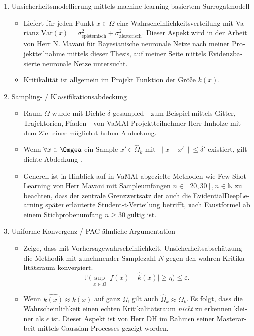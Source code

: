 \begin{otherlanguage}{ngerman}
\begin{enumerate}
  \item Unsicherheitsmodellierung mittels machine-learning basiertem Surrogatmodell
  \begin{itemize}
    \item Liefert für jeden Punkt $x \in \Omega$ eine Wahrscheinlichkeitsverteilung mit Varianz $\mathrm{Var}(x) = \sigma^{2}_{\text{epistemisch}} + \sigma^{2}_{\text{aleatorisch}}$. Dieser Aspekt wird in der Arbeit von Herr N. Mavani für \gls{Bayesianische neuronale Netze} nach meiner Projektteilnahme mittels dieser Thesis, auf meiner Seite mittels \gls{Evidenzbasierte neuronale Netze} untersucht.
    \item Kritikalität ist allgemein im Projekt Funktion der Größe $k(x)$.
  \end{itemize}
  \item Sampling- / Klassifikationsabdeckung
  \begin{itemize}
    \item Raum $\Omega$ wurde mit Dichte $\delta$ gesampled - zum Beispiel mittels Gitter, Trajektorien, Pfaden - von VaMAI Projektteilnehmer Herr Imholze mit dem Ziel einer möglichst hohen Abdeckung.
    \item Wenn $\forall x \in \Omgea$ ein Sample $x' \in \widehat{\Omega}_k$ mit $\lVert x - x' \rVert \le \delta'$ existiert, gilt \glqq dichte Abdeckung \grqq.
    \item Generell ist in Hinblick auf in VaMAI abgezielte Methoden wie \glqq{}Few Shot Learning\grqq{} von Herr Mavani mit Sampleumfängen $n \in [20, 30], n \in \mathbb{N}$ zu beachten, dass der zentrale Grenzwertsatz der auch die \gls{EvidentialDeepLearning} später erläuterte Student-t-Verteilung betrifft, nach Faustformel ab einem Stichprobenumfang $n \geq 30$ gültig ist. %
  \end{itemize}
  \item Uniforme Konvergenz / PAC-ähnliche Argumentation
  \begin{itemize}
    \item Zeige, dass mit Vorhersagewahrscheinlichkeit, Unsicherheitsabschätzung die Methodik mit zunehmender Samplezahl $N$ gegen den wahren Kritikalitätsraum konvergiert. 
    \[
    \mathbb{P}\bigl( \sup_{x \in \Omega} \bigl\lvert f(x) - \widehat{k}(x) \bigr\rvert \ge \eta \bigr) \le \varepsilon.
    \]
    \item Wenn $\widehat{k(x)} \approx k(x)$ auf ganz $\Omega$, gilt auch $\widehat{\Omega}_{k} \approx \Omega_{k}$. Es folgt, dass die Wahrscheinlichkeit einen echten Kritikalitätsraum \textit{nicht} zu erkennen kleiner als $\epsilon$ ist. Dieser Aspekt ist von Herr DH im Rahmen seiner Masterarbeit mittels Gaussian Processes gezeigt worden. 
  \end{itemize}


\end{enumerate}
\end{otherlanguage}
